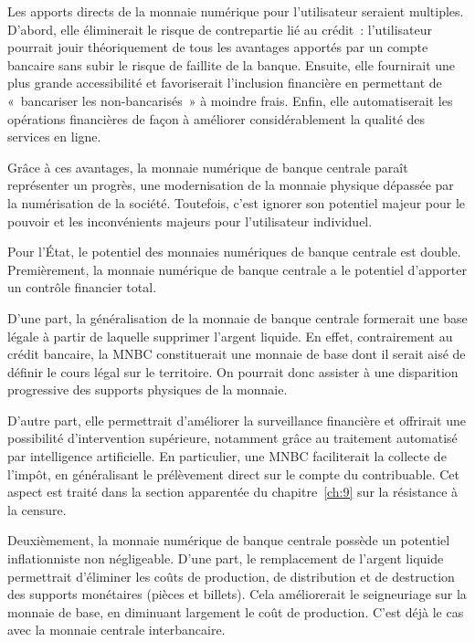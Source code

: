 Les apports directs de la monnaie numérique pour l'utilisateur seraient multiples. D'abord, elle éliminerait le risque de contrepartie lié au crédit~: l'utilisateur pourrait jouir théoriquement de tous les avantages apportés par un compte bancaire sans subir le risque de faillite de la banque. Ensuite, elle fournirait une plus grande accessibilité et favoriserait l'inclusion financière en permettant de «~bancariser les non-bancarisés~» à moindre frais. Enfin, elle automatiserait les opérations financières de façon à améliorer considérablement la qualité des services en ligne.

Grâce à ces avantages, la monnaie numérique de banque centrale paraît représenter un progrès, une modernisation de la monnaie physique dépassée par la numérisation de la société. Toutefois, c'est ignorer son potentiel majeur pour le pouvoir et les inconvénients majeurs pour l'utilisateur individuel.


Pour l'État, le potentiel des monnaies numériques de banque centrale est double. Premièrement, la monnaie numérique de banque centrale a le potentiel d'apporter un contrôle financier total.

D'une part, la généralisation de la monnaie de banque centrale formerait une base légale à partir de laquelle supprimer l'argent liquide. En effet, contrairement au crédit bancaire, la MNBC constituerait une monnaie de base dont il serait aisé de définir le cours légal sur le territoire. On pourrait donc assister à une disparition progressive des supports physiques de la monnaie.

D'autre part, elle permettrait d'améliorer la surveillance financière et offrirait une possibilité d'intervention supérieure, notamment grâce au traitement automatisé par intelligence artificielle. En particulier, une MNBC faciliterait la collecte de l'impôt, en généralisant le prélèvement direct sur le compte du contribuable. Cet aspect est traité dans la section apparentée du chapitre~\ref{ch:9} sur la résistance à la censure.


Deuxièmement, la monnaie numérique de banque centrale possède un potentiel inflationniste non négligeable. D'une part, le remplacement de l'argent liquide permettrait d'éliminer les coûts de production, de distribution et de destruction des supports monétaires (pièces et billets). Cela améliorerait le seigneuriage sur la monnaie de base, en diminuant largement le coût de production. C'est déjà le cas avec la monnaie centrale interbancaire.

